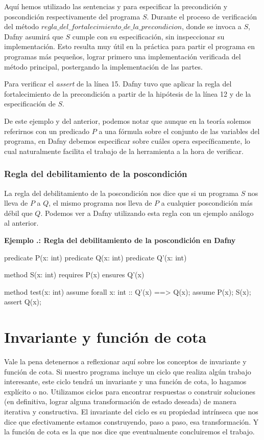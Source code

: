 \documentclass[12pt, a4paper, openany, fleqn]{book}
\newcounter{example}[chapter]
\renewcommand{\theexample}{\thechapter.\arabic{example}}
\newcommand{\example}[1]{
  \refstepcounter{example} %
  \vspace{1em}
  \noindent\textbf{Ejemplo \theexample: #1}
}
\begin{document}
    Aquí hemos utilizado las sentencias  y  para especificar la precondición y poscondición respectivamente del programa $S$. Durante el proceso de verificación del método $regla\_del\_fortalecimiento\_de\_la\_precondicion$, donde se invoca a $S$, Dafny asumirá que $S$ cumple con su especificación, sin inspeccionar su implementación. Esto resulta muy útil en la práctica para partir el programa en programas más pequeños, lograr primero una implementación verificada del método principal, postergando la implementación de las partes.

    Para verificar el \textit{assert} de la línea 15. Dafny tuvo que aplicar la regla del fortalecimiento de la precondición a partir de la hipótesis de la línea 12 y de la especificación de $S$.

    De este ejemplo y del anterior, podemos notar que aunque en la teoría solemos referirnos con un predicado $P$ a una fórmula sobre el conjunto de las variables del programa, en Dafny debemos especificar sobre cuáles opera específicamente, lo cual naturalmente facilita el trabajo de la herramienta a la hora de verificar.
    \vspace{1em}
    
    \subsubsection*{Regla del debilitamiento de la poscondición}
    La regla del debilitamiento de la poscondición nos dice que si un programa $S$ nos lleva de $P$ a $Q$, el mismo programa nos lleva de $P$ a cualquier poscondición más débil que $Q$. Podemos ver a Dafny utilizando esta regla con un ejemplo análogo al anterior.

    \example{Regla del debilitamiento de la poscondición en Dafny}
    \begin{dafny}
predicate P(x: int)
predicate Q(x: int)
predicate Q'(x: int)

method S(x: int)
    requires P(x)
    ensures Q'(x)

method test(x: int)
{
    assume forall x: int :: Q'(x) ==> Q(x);
    assume P(x);
    S(x);
    assert Q(x); 
}
    \end{dafny}

    \vspace{1em}

    \section{Invariante y función de cota}
    Vale la pena detenernos a reflexionar aquí sobre los conceptos de invariante y función de cota.
    Si nuestro programa incluye un ciclo que realiza algún trabajo interesante, este ciclo tendrá un invariante y una función de cota, lo hagamos explícito o no. Utilizamos ciclos para encontrar respuestas o construir soluciones (en definitiva, lograr alguna transformación de estado deseada) de manera iterativa y constructiva. El invariante del ciclo es su propiedad intrínseca que nos dice que efectivamente estamos construyendo, paso a paso, esa transformación. Y la función de cota es la que nos dice que eventualmente concluiremos el trabajo.
\end{document}
